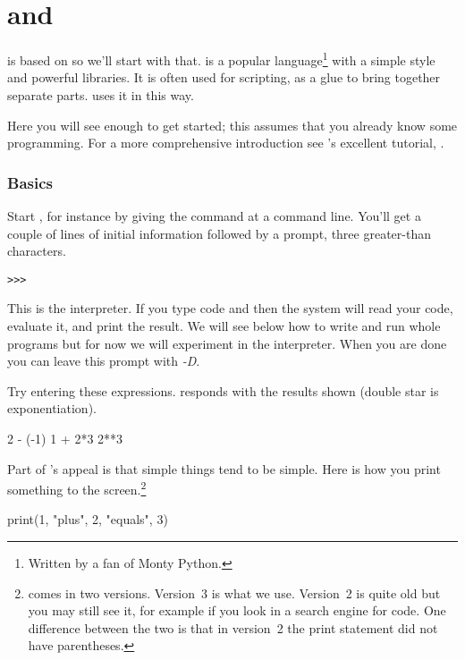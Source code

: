\chapter{\python{} and \Sage{}}

\Sage{} is based on \python{} so we'll start with that.
\python{} is a popular language\footnote{Written by a fan of
Monty Python.} 
with a simple style and powerful libraries.
It is often used for scripting, as a glue to bring together separate parts.
\Sage{} uses it in this way.

Here you will see enough \python{} to get started; this assumes 
that you already know some programming.
For a more comprehensive introduction see \python's excellent tutorial,
\cite{PythonTeam19b}.



\subsection{Basics}
Start \python, for instance by giving the command
at a command line.
You'll get a couple of lines of initial
information followed by a prompt, three greater-than
characters.
\begin{lstlisting}[style=python]
>>>   
\end{lstlisting}
This is the \python{} interpreter.
If you type 
\python{} code and  then the system
will read your code, evaluate it, and print the result.
We will see below how to write and run whole programs
but for now we will experiment in the interpreter.
When you are done you can 
leave this prompt with \textit{-D}.

Try entering these expressions.
\python{} responds with the results shown
(double star is exponentiation).
\begin{pythonconsole}
2 - (-1)
1 + 2*3
2**3  
\end{pythonconsole}

Part of \python's appeal is that simple things tend to be simple.
Here is how you print something to the screen.\footnote{%
  \protect\python{} comes in two versions.
  Version~3 is what we use.
  Version~2 is quite old but you may still see it, for example if
  you look in a search engine for code.
  One difference between the two is that in version~2 the
  print statement did not have parentheses.}
\begin{pythonconsole}
print(1, "plus", 2, "equals", 3)
\end{pythonconsole}

